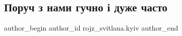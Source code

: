  
 
 
 
 
 
\subsection{Поруч з нами гучно і дуже часто}
\label{sec:16_12_2022.fb.rojz_svitlana.kyiv.1.guchno}
 
\ifcmt
 author_begin
   author_id rojz_svitlana.kyiv
 author_end
\fi
